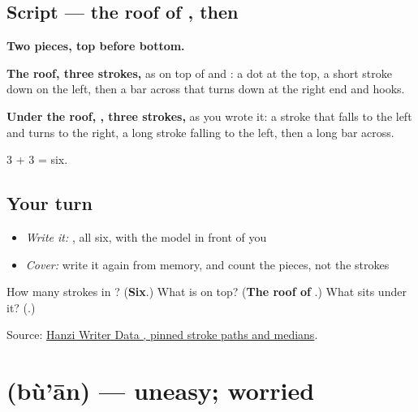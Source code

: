\subsection*{Script — the roof of , then }

\begin{quote}
\end{quote}

\textbf{Two pieces, top before bottom.}

\textbf{The roof, three strokes,} as on top of  and : a dot at the top, a short stroke down on the left, then a bar across that turns down at the right end and hooks.

\textbf{Under the roof, , three strokes,} as you wrote it: a stroke that falls to the left and turns to the right, a long stroke falling to the left, then a long bar across.

3 + 3 = six.

\subsection*{Your turn}
\begin{itemize}
\raggedright
  \item \emph{Write it:} , all six, with the model in front of you
  \item \emph{Cover:} write it again from memory, and count the pieces, not the strokes
\end{itemize}

\begin{tcolorbox}[breakable,colback=teal!4,colframe=teal!35!black,title={Before you move on}]
How many strokes in ? (\textbf{Six}.) What is on top? (\textbf{The roof of }.) What sits under it? (\textbf{}.)

Source: \href{https://raw.githubusercontent.com/chanind/hanzi-writer-data/68d10a4b21150cae5e1ebbd223eed289cf32d90c/data/\%E5\%AE\%89.json}{Hanzi Writer Data , pinned stroke paths and medians}.
\end{tcolorbox}
\section[\texorpdfstring{\zh{不安} (bù'ān)}{不安 (bù'ān)}]{ (bù'ān) — uneasy; worried}

\label{lesson:ZH-C379-buan}



